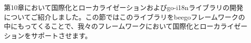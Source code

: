 第10章において国際化とローカライゼーションおよびgo-i18nライブラリの開発についてご紹介しました。この節ではこのライブラリをbeegoフレームワークの中にもってくることで、我々のフレームワークにおいて国際化とローカライゼーションをサポートさせます。
